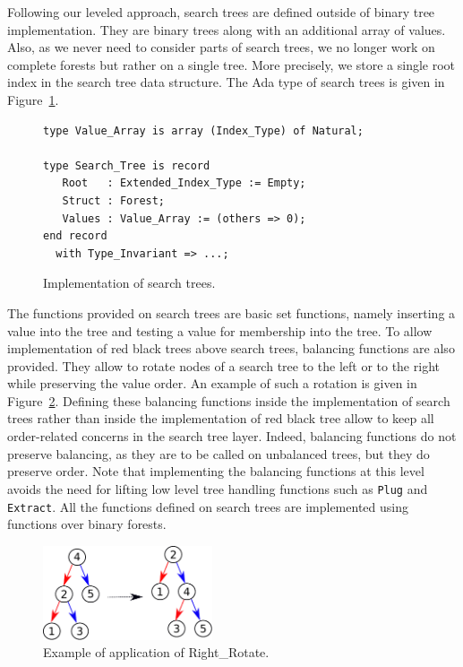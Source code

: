 \documentclass[11pt,a4paper]{article}
\begin{document}
Following our leveled approach, search trees are defined outside of binary tree implementation.
They are binary trees along with an additional array of values. Also, as we never need to consider
parts of search trees, we no longer work on complete forests but rather on a single tree. More
precisely, we store a single root index in the search tree data structure.
The Ada type of search trees is given in Figure~\ref{fig-search-typ}.

\begin{figure}[ht]
\begin{small}
\begin{lstlisting}
type Value_Array is array (Index_Type) of Natural;

type Search_Tree is record
   Root   : Extended_Index_Type := Empty;
   Struct : Forest;
   Values : Value_Array := (others => 0);
end record
  with Type_Invariant => ...;
\end{lstlisting}
\end{small}
\caption{\label{fig-search-typ} Implementation of search trees.}
\end{figure}

The functions provided on search trees are basic set functions, namely inserting a value into the tree
and testing a value for membership into the tree. To allow implementation of red black trees above
search trees, balancing functions are also provided. They allow to rotate nodes of a search tree to the
left or to the right while preserving the value order. An example of such a rotation is given in
Figure~\ref{fig-search-rot}.
Defining these balancing functions inside the implementation of
search trees rather than inside the implementation of red black tree allow to keep all order-related
concerns in the search tree layer. Indeed, balancing functions do not preserve balancing, as they
are to be called on unbalanced trees, but they do preserve order. Note that implementing the balancing
functions at this level avoids the need for lifting low level tree handling functions such as \texttt{Plug} and
\texttt{Extract}. All the functions defined on search trees are implemented using
functions over binary forests.

\begin{figure}[ht]
\begin{center}
\includegraphics[width=5cm]{rotate_right.pdf}
\caption{\label{fig-search-rot} Example of application of Right\_Rotate.}
\end{center}
\end{figure}
\end{document}
